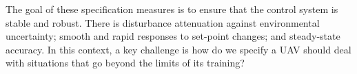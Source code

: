 \documentclass[sigconf]{acmart}
\begin{document}
The goal of these specification measures is to ensure that the control system is stable and robust. 
There is disturbance attenuation against environmental uncertainty; smooth and rapid responses to set-point changes; and steady-state accuracy. 
In this context, a key challenge is how do we specify a UAV should deal with situations that go beyond the limits of its training?
%
%
%
%
%

%
%
%
%
%
%
\end{document}
